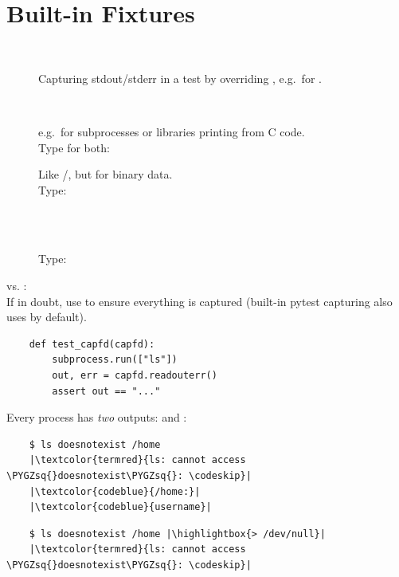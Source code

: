 \section{Built-in Fixtures}
\begin{description}
    \item[{}~] Capturing stdout/stderr in a test by overriding ,
          e.g.\ for .
    \item[~] 
          e.g.\ for subprocesses or libraries printing from C code. \\[.5em]
          Type for both: 
    \item[{\parbox[t]{6.5em}{\mono{capsysbinary}/\\\mono{capfdbinary}}}]
          \parbox[t]{6cm}{
              Like /, but for binary data. \\
              Type: 
          }
    \item[~]  \\
          Type: 
\end{description}
\vspace{-.5em}

 vs. : \\ If in doubt, use  to ensure everything is captured
(built-in pytest capturing also uses  by default).
\vspace{-.5em}

\begin{verbatim}
    def test_capfd(capfd):
        subprocess.run(["ls"])
        out, err = capfd.readouterr()
        assert out == "..."
\end{verbatim}

\vspace{-.5em}
Every process has \emph{two} outputs:  and :
\vspace{-.5em}

\begin{verbatim}
    $ ls doesnotexist /home
    |\textcolor{termred}{ls: cannot access \PYGZsq{}doesnotexist\PYGZsq{}: \codeskip}|
    |\textcolor{codeblue}{/home:}|
    |\textcolor{codeblue}{username}|
\end{verbatim}
\vspace{-1em}
\begin{verbatim}
    $ ls doesnotexist /home |\highlightbox{> /dev/null}|
    |\textcolor{termred}{ls: cannot access \PYGZsq{}doesnotexist\PYGZsq{}: \codeskip}|
\end{verbatim}
\vspace{-.5em}

